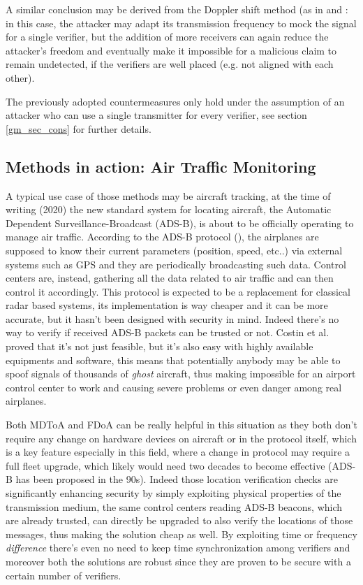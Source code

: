 A similar conclusion may be derived from the Doppler shift method (as in \cite{schaefer16} and \cite{ghose15}: in this case, the attacker may adapt its transmission frequency to mock the signal for a single verifier, but the addition of more receivers can again reduce the attacker's freedom and eventually make it impossible for a malicious claim to remain undetected, if the verifiers are well placed (e.g. not aligned with each other).

The previously adopted countermeasures only hold under the assumption of an attacker who can use a single transmitter for every verifier, see section \ref{gm_sec_cons} for further details.

\subsection{Methods in action: Air Traffic Monitoring} \label{gm_sec_adsb}

A typical use case of those methods may be aircraft tracking, at the time of writing (2020) the new standard system for locating aircraft, the Automatic Dependent Surveillance-Broadcast (ADS-B), is about to be officially operating to manage air traffic. According to the ADS-B protocol (\cite{adsb}), the airplanes are supposed to know their current parameters (position, speed, etc..) via external systems such as GPS and they are periodically broadcasting such data. Control centers are, instead, gathering all the data related to air traffic and can then control it accordingly. This protocol is expected to be a replacement for classical radar based systems, its implementation is way cheaper and it can be more accurate, but it hasn't been designed with security in mind. Indeed there's no way to verify if received ADS-B packets can be trusted or not.
Costin et al. \cite{costin12} proved that it's not just feasible, but it's also easy with highly available equipments and software, this means that potentially anybody may be able to spoof signals of thousands of \textit{ghost} aircraft, thus making impossible for an airport control center to work and causing severe problems or even danger among real airplanes.

Both MDToA and FDoA can be really helpful in this situation as they both don't require any change on hardware devices on aircraft or in the protocol itself, which is a key feature especially in this field, where a change in protocol may require a full fleet upgrade, which likely would need two decades to become effective (ADS-B has been proposed in the 90s). Indeed those location verification checks are significantly enhancing security by simply exploiting physical properties of the transmission medium, the same control centers reading ADS-B beacons, which are already trusted, can directly be upgraded to also verify the locations of those messages, thus making the solution cheap as well. By exploiting time or frequency \textit{difference} there's even no need to keep time synchronization among verifiers and moreover both the solutions are robust since they are proven to be secure with a certain number of verifiers.

